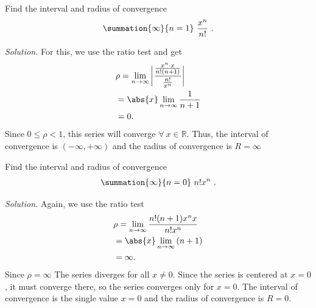 \documentclass{report}
\begin{document}
    \pagebreak \bigbreak \noindent 
    \begin{exm}
        Find the interval and radius of convergence
        \begin{align*}
            \summation{\infty}{n=1}\ \frac{x^{n}}{n!}\ 
        .\end{align*}
    \end{exm}
    \bigbreak \noindent 
    \textit{Solution.} For this, we use the ratio test and get
    \begin{align*}
        &\rho = \lim\limits_{n \to \infty}{\bigg\lvert \frac{\frac{x^{n}\cdot x}{n!(n+1)}}{\frac{n!}{x^{n}}} \bigg\rvert} \\
        &=\abs{x}\lim\limits_{n \to \infty}{\frac{1}{n+1}} \\
        &=0
    .\end{align*}
    \bigbreak \noindent 
    Since $ 0 \leq \rho  < 1$, this series will converge $\forall\ x \in \mathbb{R} $. Thus, the interval of convergence is $(-\infty,+\infty) $ and the radius of convergence is $R = \infty $

    \bigbreak \noindent 
    \begin{exm}
         Find the interval and radius of convergence
         \begin{align*}
             \summation{\infty}{n=0}\ n!x^{n}\ 
         .\end{align*}
    \end{exm}
    \bigbreak \noindent 
    \textit{Solution.} Again, we use the ratio test
    \begin{align*}
        &\rho = \lim\limits_{n \to \infty}{\frac{n!(n+1)x^{n}x}{n!x^{n}}} \\
        &=\abs{x}\lim\limits_{n \to \infty}{(n+1)} \\
        &=\infty
    .\end{align*}
    \bigbreak \noindent 
    Since $\rho = \infty $ The series diverges for all \( x \neq 0 \). Since the series is centered at \( x = 0 \), it must converge there, so the series converges only for \( x = 0 \). The interval of convergence is the single value \( x = 0 \) and the radius of convergence is \( R = 0 \).
\end{document}
